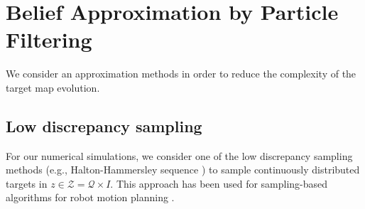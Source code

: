 \documentclass[journal]{IEEEtran}
\begin{document}
\section{Belief Approximation by Particle Filtering}
\label{sec:sec6}
We consider an approximation methods in order to reduce the complexity of the target map evolution. 
\subsection{Low discrepancy sampling} 
For our numerical simulations, we consider one of the low discrepancy sampling methods (e.g., Halton-Hammersley sequence \cite{beardwood1959shortest}) to sample continuously distributed targets in $z \in \mathcal{Z} = \mathcal{Q} \times {I}$. This approach has been used for sampling-based algorithms for robot motion planning \cite{lavalle2006planning}.
\end{document}
